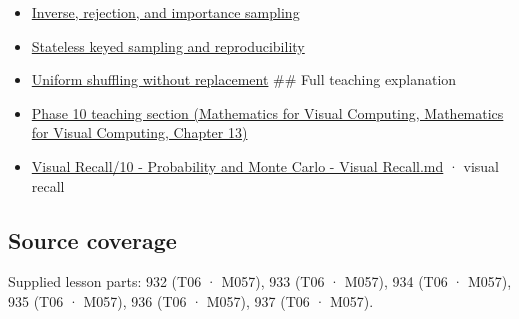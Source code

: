 \begin{itemize}
\item
  \hyperref[appendix-8d863ed954d0]{Inverse, rejection, and importance sampling}
\item
  \hyperref[appendix-daaf25bfd3a0]{Stateless keyed sampling and reproducibility}
\item
  \hyperref[appendix-184fcc411663]{Uniform shuffling without replacement} \#\# Full teaching explanation
\item
  \href{../02-Mathematics-for-Visual-Computing/main.pdf\#nameddest=02-foundations-ii-ch029-a-computer-produces-deterministic-pseudorandom-sequences}{Phase 10 teaching section (Mathematics for Visual Computing, Mathematics for Visual Computing, Chapter 13)}
\item
  \hyperref[appendix-cb5af353ef77]{Visual Recall/10 - Probability and Monte Carlo - Visual Recall.md} · visual recall
\end{itemize}

\subsection{Source coverage}\label{appendix-e0f7c7e08f3a-source-coverage}

Supplied lesson parts: 932 (T06 · M057), 933 (T06 · M057), 934 (T06 · M057), 935 (T06 · M057), 936 (T06 · M057), 937 (T06 · M057).
